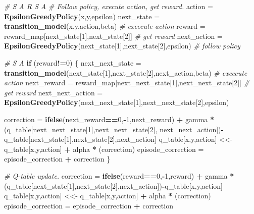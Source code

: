 \documentclass[
]{article}
\newenvironment{Shaded}{\begin{snugshade}}{\end{snugshade}}
\newcommand{\CommentTok}[1]{\textcolor[rgb]{0.56,0.35,0.01}{\textit{#1}}}
\newcommand{\ControlFlowTok}[1]{\textcolor[rgb]{0.13,0.29,0.53}{\textbf{#1}}}
\newcommand{\DecValTok}[1]{\textcolor[rgb]{0.00,0.00,0.81}{#1}}
\newcommand{\FunctionTok}[1]{\textcolor[rgb]{0.13,0.29,0.53}{\textbf{#1}}}
\newcommand{\NormalTok}[1]{#1}
\newcommand{\OtherTok}[1]{\textcolor[rgb]{0.56,0.35,0.01}{#1}}
\newcommand{\SpecialCharTok}[1]{\textcolor[rgb]{0.81,0.36,0.00}{\textbf{#1}}}
\begin{document}
\begin{Shaded}
\begin{Highlighting}[]
    \CommentTok{\# S A R S A}
    \CommentTok{\# Follow policy, execute action, get reward.}
\NormalTok{    action }\OtherTok{=} \FunctionTok{EpsilonGreedyPolicy}\NormalTok{(x,y,epsilon)}
\NormalTok{    next\_state }\OtherTok{=} \FunctionTok{transition\_model}\NormalTok{(x,y,action,beta) }\CommentTok{\# excecute action}
\NormalTok{    reward }\OtherTok{=}\NormalTok{ reward\_map[next\_state[}\DecValTok{1}\NormalTok{],next\_state[}\DecValTok{2}\NormalTok{]] }\CommentTok{\# get reward}
\NormalTok{    next\_action }\OtherTok{=} \FunctionTok{EpsilonGreedyPolicy}\NormalTok{(next\_state[}\DecValTok{1}\NormalTok{],next\_state[}\DecValTok{2}\NormalTok{],epsilon) }\CommentTok{\# follow policy}
    
    \CommentTok{\# S A}
    \ControlFlowTok{if}\NormalTok{ (reward}\SpecialCharTok{!=}\DecValTok{0}\NormalTok{) \{}
\NormalTok{      next\_next\_state }\OtherTok{=} \FunctionTok{transition\_model}\NormalTok{(next\_state[}\DecValTok{1}\NormalTok{],next\_state[}\DecValTok{2}\NormalTok{],next\_action,beta) }\CommentTok{\# excecute action}
\NormalTok{      next\_reward }\OtherTok{=}\NormalTok{ reward\_map[next\_next\_state[}\DecValTok{1}\NormalTok{],next\_next\_state[}\DecValTok{2}\NormalTok{]] }\CommentTok{\# get reward}
\NormalTok{      next\_next\_action }\OtherTok{=} \FunctionTok{EpsilonGreedyPolicy}\NormalTok{(next\_next\_state[}\DecValTok{1}\NormalTok{],next\_next\_state[}\DecValTok{2}\NormalTok{],epsilon)}
    
\NormalTok{      correction }\OtherTok{=} \FunctionTok{ifelse}\NormalTok{(next\_reward}\SpecialCharTok{==}\DecValTok{0}\NormalTok{,}\SpecialCharTok{{-}}\DecValTok{1}\NormalTok{,next\_reward) }\SpecialCharTok{+}\NormalTok{ gamma }\SpecialCharTok{*}\NormalTok{ (q\_table[next\_next\_state[}\DecValTok{1}\NormalTok{],next\_next\_state[}\DecValTok{2}\NormalTok{],}
\NormalTok{                                                                            next\_next\_action])}\SpecialCharTok{{-}}\NormalTok{q\_table[next\_state[}\DecValTok{1}\NormalTok{],next\_state[}\DecValTok{2}\NormalTok{],next\_action]}
\NormalTok{      q\_table[x,y,action] }\OtherTok{\textless{}\textless{}{-}}\NormalTok{ q\_table[x,y,action] }\SpecialCharTok{+}\NormalTok{ alpha }\SpecialCharTok{*}\NormalTok{ (correction)}
\NormalTok{      episode\_correction }\OtherTok{=}\NormalTok{ episode\_correction }\SpecialCharTok{+}\NormalTok{ correction      }
\NormalTok{    \} }

    \CommentTok{\# Q{-}table update.}
\NormalTok{    correction }\OtherTok{=} \FunctionTok{ifelse}\NormalTok{(reward}\SpecialCharTok{==}\DecValTok{0}\NormalTok{,}\SpecialCharTok{{-}}\DecValTok{1}\NormalTok{,reward) }\SpecialCharTok{+}\NormalTok{ gamma }\SpecialCharTok{*}\NormalTok{ (q\_table[next\_state[}\DecValTok{1}\NormalTok{],next\_state[}\DecValTok{2}\NormalTok{],next\_action])}\SpecialCharTok{{-}}\NormalTok{q\_table[x,y,action]}
\NormalTok{    q\_table[x,y,action] }\OtherTok{\textless{}\textless{}{-}}\NormalTok{ q\_table[x,y,action] }\SpecialCharTok{+}\NormalTok{ alpha }\SpecialCharTok{*}\NormalTok{ (correction)}
\NormalTok{    episode\_correction }\OtherTok{=}\NormalTok{ episode\_correction }\SpecialCharTok{+}\NormalTok{ correction}


\end{Highlighting}
\end{Shaded}
\end{document}
